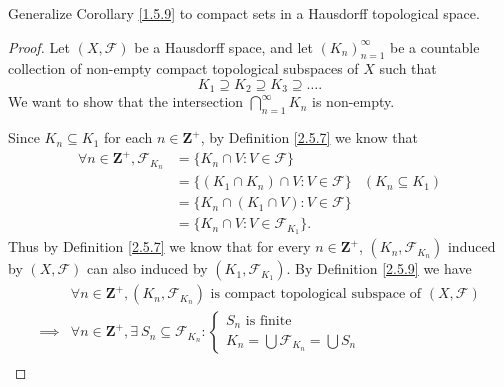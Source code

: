 \begin{exercise}\label{ex 2.5.13}
    Generalize Corollary \ref{1.5.9} to compact sets in a Hausdorff topological space.
\end{exercise}

\begin{proof}
    Let \((X, \mathcal{F})\) be a Hausdorff space, and let \((K_n)_{n = 1}^\infty\) be a countable collection of non-empty compact topological subspaces of \(X\) such that
    \[
        K_1 \supseteq K_2 \supseteq K_3 \supseteq \dots.
    \]
    We want to show that the intersection \(\bigcap_{n = 1}^\infty K_n\) is non-empty.

    Since \(K_n \subseteq K_1\) for each \(n \in \mathbf{Z}^+\), by Definition \ref{2.5.7} we know that
    \begin{align*}
        \forall n \in \mathbf{Z}^+, \mathcal{F}_{K_n} & = \{K_n \cap V : V \in \mathcal{F}\}                                  \\
                                                      & = \{(K_1 \cap K_n) \cap V : V \in \mathcal{F}\} & (K_n \subseteq K_1) \\
                                                      & = \{K_n \cap (K_1 \cap V) : V \in \mathcal{F}\}                       \\
                                                      & = \{K_n \cap V : V \in \mathcal{F}_{K_1}\}.
    \end{align*}
    Thus by Definition \ref{2.5.7} we know that for every \(n \in \mathbf{Z}^+\), \((K_n, \mathcal{F}_{K_n})\) induced by \((X, \mathcal{F})\) can also induced by \((K_1, \mathcal{F}_{K_1})\).
    By Definition \ref{2.5.9} we have
    \begin{align*}
                 & \forall n \in \mathbf{Z}^+, (K_n, \mathcal{F}_{K_n}) \text{ is compact topological subspace of } (X, \mathcal{F})                                                                \\
        \implies & \forall n \in \mathbf{Z}^+, \exists\ S_n \subseteq \mathcal{F}_{K_n} : \begin{cases}
                                                                                              S_n \text{ is finite} \\
                                                                                              K_n = \bigcup \mathcal{F}_{K_n} = \bigcup S_n
                                                                                          \end{cases}                                                              \\

\end{align*}
\end{proof}
